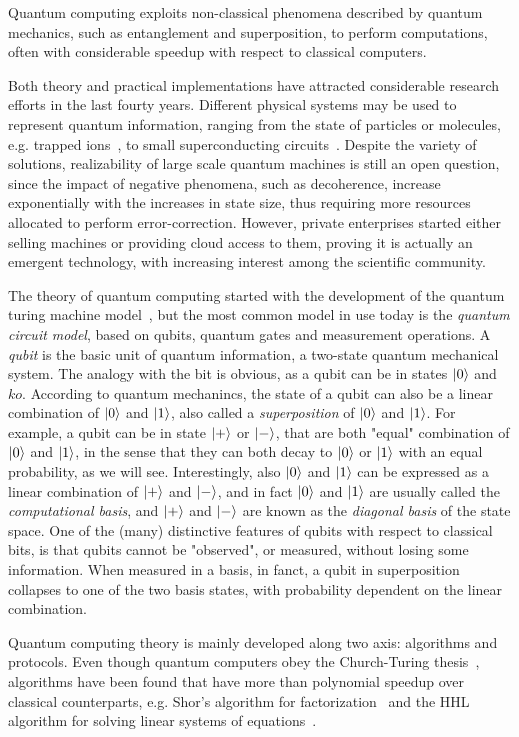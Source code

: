 Quantum computing exploits non-classical phenomena described by quantum
mechanics, such as entanglement and superposition, to perform computations,
 often with considerable speedup with respect to classical computers.

Both theory and practical implementations have attracted considerable research
efforts in the last fourty years. Different physical systems may be used to represent
quantum information, ranging from the state of
particles or molecules, e.g. trapped ions~\cite{pogorelov_compact_2021}, to
small superconducting circuits~\cite{clarke_superconducting_2008}. Despite the
variety of solutions, realizability of large scale quantum machines is still an
open question, since the impact of negative phenomena, such as decoherence,
increase exponentially with the increases in state size, thus requiring more resources allocated to
perform error-correction. However, private enterprises started
either selling machines or providing cloud access to them, proving it is actually 
an emergent technology, with increasing interest among the scientific community.

The theory of quantum computing started with the development of the quantum
turing machine model~\cite{benioff_quantum_1982}, but the most common model
in use today is the\textit{ quantum circuit model}, based on qubits, quantum gates and
measurement operations. A \textit{qubit} is the basic unit of quantum information, a
two-state quantum mechanical system. The analogy with the bit is obvious, as a qubit can be in states $\ket{0}$ and $ko$. According to quantum mechanincs, the state of a qubit can also be a linear combination of $\ket{0}$ and $\ket{1}$, also called a \textit{superposition} of $\ket{0}$ and $\ket{1}$. For example, a qubit can be in state $\ket{+}$ or $\ket{-}$, that are both "equal" combination of $\ket{0}$ and $\ket{1}$, in the sense that they can both decay to $\ket{0}$ or $\ket{1}$ with an equal probability, as we will see. Interestingly, also $\ket{0}$ and $\ket{1}$ can be expressed as a linear combination of $\ket{+}$ and $\ket{-}$, and in fact  $\ket{0}$ and $\ket{1}$ are usually called the \textit{computational basis}, and $\ket{+}$ and $\ket{-}$ are known as the \textit{diagonal basis} of the state space. One of the (many) distinctive features of qubits with respect to classical bits, is that qubits cannot be "observed", or measured, without losing some information. When measured in a basis, in fanct, a qubit in superposition collapses to one of the two basis states,
with probability dependent on the linear combination.

Quantum computing theory is mainly developed along two axis: algorithms and
protocols. Even though quantum computers obey the Church-Turing
thesis~\cite{nielsen_quantum_2010}, algorithms have been found that have more
than polynomial speedup over classical counterparts, e.g. Shor's algorithm for
factorization~\cite{shor_algorithms_1994} and the HHL algorithm for solving
linear systems of equations~\cite{harrow_quantum_2009}.


